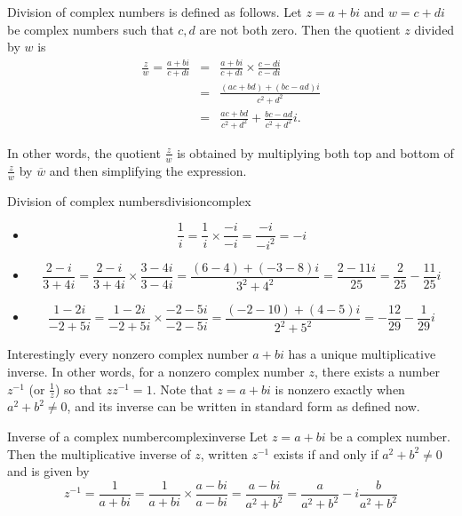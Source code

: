 Division of complex numbers is defined as follows. Let $z=a+bi$ and $w=c+di$ be complex numbers such that $c,d$ are not both zero. Then the quotient $z$ divided by $w$ is
\begin{eqnarray*}
\frac{z}{w}=
\frac{a+bi}{c+di} & = & \frac{a+bi}{c+di}\times \frac{c-di}{c-di} \\
& = & \frac{(ac+bd)+(bc-ad)i}{c^2+d^2} \\
& = & \frac{ac+bd}{c^2+d^2} +\frac{bc-ad}{c^2+d^2}i.
\end{eqnarray*}

In other words, the quotient $\frac{z}{w}$ is obtained by multiplying
both top and bottom of $\frac{z}{w}$ by $\overline{w}$ and
then simplifying the expression.

\begin{example}{Division of complex numbers}{divisioncomplex}
\begin{itemize}
\item
\[ \frac{1}{i} = \frac{1}{i}\times \frac{-i}{-i}
=\frac{-i}{-i^2}=-i \]

\item
\[ \frac{2-i}{3+4i} = \frac{2-i}{3+4i}\times \frac{3-4i}{3-4i}
=\frac{(6-4)+(-3-8)i}{3^2+4^2}
=\frac{2-11i}{25}
=\frac{2}{25} - \frac{11}{25}i \]

\item

\[ \frac{1-2i}{-2+5i} = \frac{1-2i}{-2+5i}\times \frac{-2-5i}{-2-5i}
=\frac{(-2-10) + (4-5)i}{2^2+5^2}
=-\frac{12}{29}-\frac{1}{29}i  \]
\end{itemize}
\end{example}

Interestingly every nonzero complex number $a+bi$ has a unique
multiplicative inverse. In other words, for a nonzero complex number
$z$, there exists a number $z^{-1}$ (or $\frac{1}{z}$) so that
$zz^{-1} = 1$. Note that $z=a+bi$ is nonzero exactly when
$a^{2}+b^{2}\neq 0$, and its inverse can be written in standard form as defined now. 

\begin{definition}{Inverse of a complex number}{complexinverse}
Let $z = a+bi$ be a complex number. Then the multiplicative inverse of $z$, written $z^{-1}$ exists if and only if $a^{2}+b^{2}\neq 0$ and is given by 
\begin{equation*}
z^{-1} = \frac{1}{a+bi}  = \frac{1}{a+bi}\times \frac{a-bi}{a-bi}=\frac{a-bi}{a^{2}+b^{2}}=\frac{a}{a^{2}+b^{2}}-i\frac{b}{
a^{2}+b^{2}}
\end{equation*}
\end{definition}

